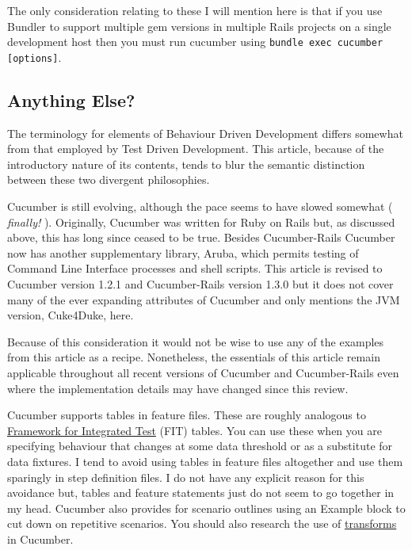 The only consideration relating to these I will mention here is that if you use Bundler to support multiple gem versions in multiple Rails projects on a single development host then you must run cucumber using \verb+bundle exec cucumber [options]+.

\subsection{Anything Else?}

The terminology for elements of Behaviour Driven Development differs somewhat from that employed by Test Driven Development.  This article, because of the introductory nature of its contents, tends to blur the semantic distinction between these two divergent philosophies.

Cucumber is still evolving, although the pace seems to have slowed somewhat ( \emph{finally!} ).  Originally, Cucumber was written for Ruby on Rails but,  as discussed above, this has long since ceased to be true. Besides Cucumber-Rails Cucumber now has another supplementary library, Aruba, which permits testing of Command Line Interface processes and shell scripts.  This article is revised to Cucumber version 1.2.1 and Cucumber-Rails version 1.3.0 but it does not cover many of the ever expanding attributes of Cucumber and only mentions the JVM version, Cuke4Duke, here.

Because of this consideration it would not be wise to use any of the examples from this article as a recipe. Nonetheless, the essentials of this article remain applicable throughout all recent versions of Cucumber and Cucumber-Rails even where the implementation details may have changed since this review.

Cucumber supports tables in feature files.  These are roughly analogous to \href{http://fit.c2.com/}{Framework for Integrated Test} (FIT) tables.  You can use these when you are specifying behaviour that changes at some data threshold or as a substitute for data fixtures.  I tend to avoid using tables in feature files altogether and use them sparingly in step definition files.  I do not have any explicit reason for this avoidance but, tables and feature statements just do not seem to go together in my head.  Cucumber also provides for scenario outlines using an Example block to cut down on repetitive scenarios.  You should also research the use of \href{http://www.engineyard.com/blog/2009/cucumber-step-argument-transforms/}{transforms} in Cucumber.

